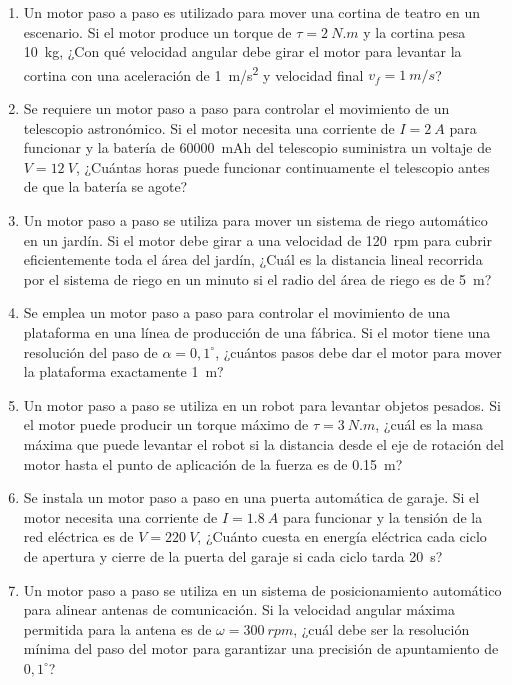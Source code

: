 \documentclass[../main]{subfiles}
\begin{document}
\begin{enumerate}
  \item Un motor paso a paso es utilizado para mover una cortina de teatro en un escenario. Si el motor produce un torque de $\tau = \qty{2}{N.m}$ y la cortina pesa \qty{10}{kg}, ¿Con qué velocidad angular debe girar el motor para levantar la cortina con una aceleración de \qty{1}{m/s^2} y velocidad final $v_f=\qty{1}{m/s}$?
  \item Se requiere un motor paso a paso para controlar el movimiento de un telescopio astronómico. Si el motor necesita una corriente de $I = \qty{2}{A}$ para funcionar y la batería de \qty{60000}{mAh} del telescopio suministra un voltaje de $V = \qty{12}{V}$, ¿Cuántas horas puede funcionar continuamente el telescopio antes de que la batería se agote?
  \item Un motor paso a paso se utiliza para mover un sistema de riego automático en un jardín. Si el motor debe girar a una velocidad de \qty{120}{rpm} para cubrir eficientemente toda el área del jardín, ¿Cuál es la distancia lineal recorrida por el sistema de riego en un minuto si el radio del área de riego es de \qty{5}{m}?
  \item Se emplea un motor paso a paso para controlar el movimiento de una plataforma en una línea de producción de una fábrica. Si el motor tiene una resolución del paso de $\alpha = 0,1^\circ$, ¿cuántos pasos debe dar el motor para mover la plataforma exactamente \qty{1}{m}?
  \item Un motor paso a paso se utiliza en un robot para levantar objetos pesados. Si el motor puede producir un torque máximo de $\tau = \qty{3}{N.m}$, ¿cuál es la masa máxima que puede levantar el robot si la distancia desde el eje de rotación del motor hasta el punto de aplicación de la fuerza es de \qty{0,15}{m}?
  \item Se instala un motor paso a paso en una puerta automática de garaje. Si el motor necesita una corriente de $I = \qty{1,8}{A}$ para funcionar y la tensión de la red eléctrica es de $V = \qty{220}{V}$, ¿Cuánto cuesta en energía eléctrica cada ciclo de apertura y cierre de la puerta del garaje si cada ciclo tarda \qty{20}{s}?
  \item Un motor paso a paso se utiliza en un sistema de posicionamiento automático para alinear antenas de comunicación. Si la velocidad angular máxima permitida para la antena es de $\omega = \qty{300}{rpm}$, ¿cuál debe ser la resolución mínima del paso del motor para garantizar una precisión de apuntamiento de $0,1^\circ$?
\end{enumerate}
\end{document}
